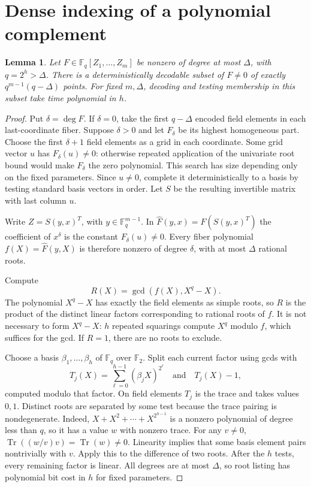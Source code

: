 \documentclass[11pt,a4paper]{article}
\newcommand{\F}{\mathbb F}
\DeclareMathOperator{\Tr}{Tr}
\newtheorem{lemma}[theorem]{Lemma}
\theoremstyle{definition}
\theoremstyle{remark}
\numberwithin{equation}{section}
\begin{document}
\appendix
\section{Dense indexing of a polynomial complement}\label{sec:decoder}

\begin{lemma}\label{lem:decoder}
Let $F\in\F_q[Z_1,\ldots,Z_m]$ be nonzero of degree at most $\Delta$, with $q=2^h>\Delta$. There is a deterministically decodable subset of $F\ne0$ of exactly $q^{m-1}(q-\Delta)$ points. For fixed $m,\Delta$, decoding and testing membership in this subset take time polynomial in $h$.
\end{lemma}

\begin{proof}
Put $\delta=\deg F$. If $\delta=0$, take the first $q-\Delta$ encoded field elements in each last-coordinate fiber. Suppose $\delta>0$ and let $F_\delta$ be its highest homogeneous part. Choose the first $\delta+1$ field elements as a grid in each coordinate. Some grid vector $u$ has $F_\delta(u)\ne0$: otherwise repeated application of the univariate root bound would make $F_\delta$ the zero polynomial. This search has size depending only on the fixed parameters. Since $u\ne0$, complete it deterministically to a basis by testing standard basis vectors in order. Let $S$ be the resulting invertible matrix with last column $u$.

Write $Z=S(y,x)^T$, with $y\in\F_q^{m-1}$. In $\widehat F(y,x)=F(S(y,x)^T)$ the coefficient of $x^\delta$ is the constant $F_\delta(u)\ne0$. Every fiber polynomial $f(X)=\widehat F(y,X)$ is therefore nonzero of degree $\delta$, with at most $\Delta$ rational roots.

Compute
\[
R(X)=\gcd(f(X),X^q-X).
\]
The polynomial $X^q-X$ has exactly the field elements as simple roots, so $R$ is the product of the distinct linear factors corresponding to rational roots of $f$. It is not necessary to form $X^q-X$: $h$ repeated squarings compute $X^q$ modulo $f$, which suffices for the gcd. If $R=1$, there are no roots to exclude.

Choose a basis $\beta_1,\ldots,\beta_h$ of $\F_q$ over $\F_2$. Split each current factor using gcds with
\begin{equation}\label{eq:trace-split}
T_j(X)=\sum_{\ell=0}^{h-1}(\beta_jX)^{2^\ell}
\quad\text{and}\quad T_j(X)-1,
\end{equation}
computed modulo that factor. On field elements $T_j$ is the trace and takes values $0,1$. Distinct roots are separated by some test because the trace pairing is nondegenerate. Indeed, $X+X^2+\cdots+X^{2^{h-1}}$ is a nonzero polynomial of degree less than $q$, so it has a value $w$ with nonzero trace. For any $v\ne0$, $\Tr((w/v)v)=\Tr(w)\ne0$. Linearity implies that some basis element pairs nontrivially with $v$. Apply this to the difference of two roots. After the $h$ tests, every remaining factor is linear. All degrees are at most $\Delta$, so root listing has polynomial bit cost in $h$ for fixed parameters.


\end{proof}
\end{document}
